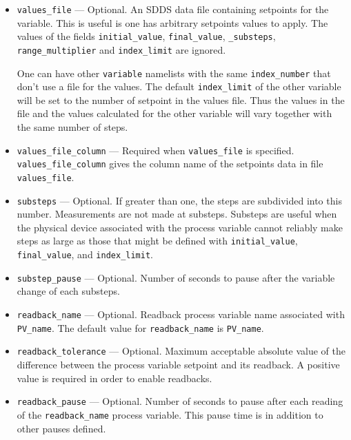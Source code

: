 \begin{itemize}
\begin{itemize}
\begin{itemize}
   \item {\verb+values_file+} --- Optional. An SDDS data file
      containing setpoints for the variable.  This is useful is one
      has arbitrary setpoints values to apply.  The values of the
      fields {\verb+initial_value+}, {\verb+final_value+},
      {\verb+_substeps+}, {\verb+range_multiplier+} and
      {\verb+index_limit+} are ignored.

      One can have other \verb+variable+ namelists with the same
      \verb+index_number+ that don't use a file for the values.  The
      default {\verb+index_limit+} of the other variable will be set
      to the number of setpoint in the values file.  Thus the values
      in the file and the values calculated for the other variable
      will vary together with the same number of steps.

   \item {\verb+values_file_column+} --- Required when
      {\verb+values_file+} is specified.  {\verb+values_file_column+}
      gives the column name of the setpoints data in file
      {\verb+values_file+}.

   \item {\verb+substeps+} --- Optional. If greater than one, the
      steps are subdivided into this number.  Measurements are not
      made at substeps. Substeps are useful when the physical device
      associated with the process variable cannot reliably make steps
      as large as those that might be defined with
      {\verb+initial_value+}, {\verb+final_value+}, and
      {\verb+index_limit+}.

   \item {\verb+substep_pause+} --- Optional. Number of seconds to
      pause after the variable change of each substeps.

   \item {\verb+readback_name+} --- Optional. Readback process
      variable name associated with {\verb+PV_name+}. The default
      value for {\verb+readback_name+} is {\verb+PV_name+}.

   \item {\verb+readback_tolerance+} --- Optional. Maximum acceptable
      absolute value of the difference between the process variable
      setpoint and its readback. A positive value is required in order
      to enable readbacks.

   \item {\verb+readback_pause+} --- Optional. Number of seconds to
      pause after each reading of the {\verb+readback_name+} process
      variable.  This pause time is in addition to other pauses
      defined.


\end{itemize}
\end{itemize}
\end{itemize}
